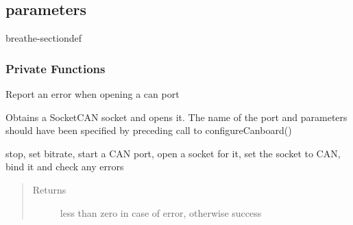 \documentclass[a4paper,10pt,english]{sphinxmanual}
\begin{document}
\subsection{parameters}
\label{\detokenize{vendors/peak:parameters}}

\begin{fulllineitems}
%
\pysigstartmultiline
{}%
\pysigstopmultiline
\begin{sphinxuseclass}{breathe-sectiondef}\subsubsection*{Private Functions}


\begin{fulllineitems}
%
\pysigstartmultiline
{}%
\pysigstopmultiline
\sphinxAtStartPar
Report an error when opening a can port 

\end{fulllineitems}



\begin{fulllineitems}
%
\pysigstartmultiline
{}%
\pysigstopmultiline
\sphinxAtStartPar
Obtains a SocketCAN socket and opens it. The name of the port and parameters should have been specified by preceding call to configureCanboard()

\sphinxAtStartPar

stop, set bitrate, start a CAN port, open a socket for it, set the socket to CAN, bind it and check any errors 
\begin{quote}\begin{description}
\item[{Returns}] \leavevmode
\sphinxAtStartPar
less than zero in case of error, otherwise success

\end{description}\end{quote}

\end{fulllineitems}




\end{sphinxuseclass}
\end{fulllineitems}
\end{document}
